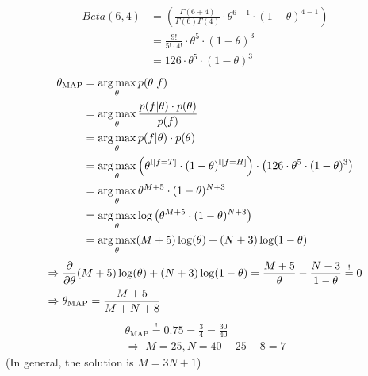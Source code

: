 %
%
%
%
%
\begin{align*}
  Beta(6,4) &= \left(\frac{\Gamma(6+4)}{\Gamma(6)\Gamma(4)} \cdot \theta^{6-1} \cdot (1-\theta)^{4-1}\right) \\
  &= \frac{9!}{5! \cdot 4!} \cdot \theta^5\cdot  (1-\theta)^3 \\
  &= 126 \cdot \theta^5 \cdot (1-\theta)^3
\end{align*}
\begin{align*}
  \theta_{\text{MAP}} &= \operatorname*{arg\,max}_\theta p(\theta|f) \\
  &= \operatorname*{arg\,max}_\theta \frac{p(f|\theta) \cdot p(\theta)}{p(f)} \\
  &= \operatorname*{arg\,max}_\theta p(f|\theta) \cdot p(\theta) \\
  &= \operatorname*{arg\,max}_\theta \left(\theta^{\mathbb{I}[f=T]} \cdot (1-\theta)^{\mathbb{I}[f=H]}\right) \cdot \left(126 \cdot \theta^5 \cdot (1-\theta)^3\right) \\
  &= \operatorname*{arg\,max}_\theta \theta^{M+5} \cdot (1-\theta)^{N+3} \\
  &= \operatorname*{arg\,max}_\theta \log\left(\theta^{M+5} \cdot (1-\theta)^{N+3}\right) \\ 
  &= \operatorname*{arg\,max}_\theta (M+5) \log(\theta) + (N+3) \log(1-\theta)
\end{align*}
\begin{align*}
  \Rightarrow \; & \frac{\partial}{\partial \theta} (M+5) \log(\theta) + (N+3) \log(1-\theta) = \frac{M+5}{\theta} - \frac{N-3}{1-\theta} \overset{!}{=} 0 \\
  \Rightarrow \; & \theta_\text{MAP} = \frac{M+5}{M+N+8}
\end{align*}
\begin{align*}
  \theta_\text{MAP} \overset{!}{=} 0.75 = \frac{3}{4} = \frac{30}{40} \\
  \Rightarrow \; M=25, N=40-25-8= 7
\end{align*}
(In general, the solution is $M=3N+1$)
%
%
%
%
%

%



